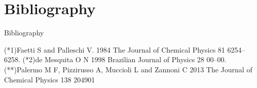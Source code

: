 \documentclass{beamer}
\begin{document}

\section*{Bibliography}
\begin{frame}[allowframebreaks]{Bibliography}

\beamertemplatebookbibitems
\begin{thebibliography}{}



\bibitem{---} (*1)Faetti S and Palleschi V. 1984 The Journal of Chemical Physics 81 6254–6258.
\bibitem{---} (*2)de Mesquita O N 1998 Brazilian Journal of Physics 28 00–00.
\bibitem{---} (**)Palermo M F, Pizzirusso A, Muccioli L and Zannoni C 2013 The Journal of Chemical Physics 138 204901


\end{thebibliography}
\end{frame}
\end{document}
